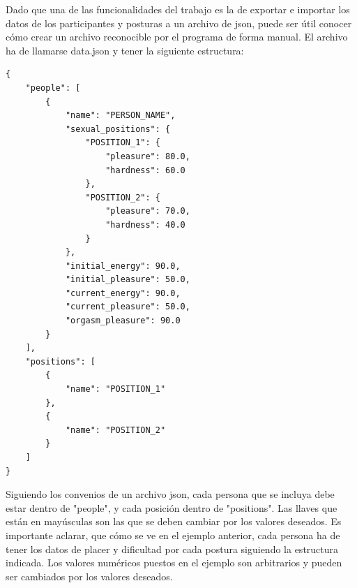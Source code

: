 \documentclass[12pt]{article}
\begin{document}
Dado que una de las funcionalidades del trabajo es la de exportar e importar los datos de los participantes y posturas a un archivo de json, puede ser útil conocer cómo crear un archivo reconocible por el programa de forma manual. El archivo ha de llamarse data.json y tener la siguiente estructura:

\begin{verbatim}
{
    "people": [
        {
            "name": "PERSON_NAME",
            "sexual_positions": {
                "POSITION_1": {
                    "pleasure": 80.0,
                    "hardness": 60.0
                },
                "POSITION_2": {
                    "pleasure": 70.0,
                    "hardness": 40.0
                }
            },
            "initial_energy": 90.0,
            "initial_pleasure": 50.0,
            "current_energy": 90.0,
            "current_pleasure": 50.0,
            "orgasm_pleasure": 90.0
        }
    ],
    "positions": [
        {
            "name": "POSITION_1"
        },
        {
            "name": "POSITION_2"
        }
    ]
}
\end{verbatim}
\newpage
Siguiendo los convenios de un archivo json, cada persona que se incluya debe estar dentro de "people", y cada posición dentro de "positions". Las llaves que están en mayúsculas son las que se deben cambiar por los valores deseados. Es importante aclarar, que cómo se ve en el ejemplo anterior, cada persona ha de tener los datos de placer y dificultad por cada postura siguiendo la estructura indicada. Los valores numéricos puestos en el ejemplo son arbitrarios y pueden ser cambiados por los valores deseados.
\end{document}
